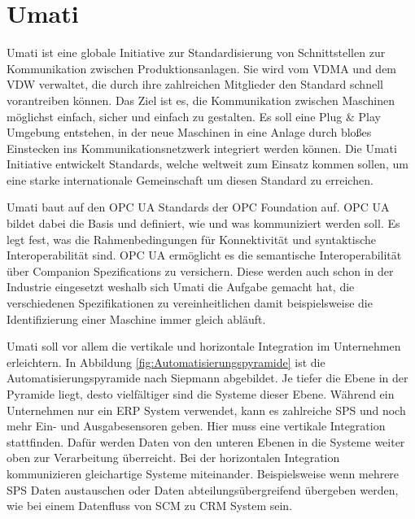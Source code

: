 \documentclass[a4paper, 12pt, oneside, toc=listofnumbered, bibliography=totoc]{scrbook}
\begin{document}
		
	
	\section{Umati}
		
		\ac{Umati} ist eine globale Initiative zur Standardisierung von Schnittstellen zur Kommunikation zwischen Produktionsanlagen. Sie wird vom \ac{VDMA} und dem \ac{VDW} verwaltet, die durch ihre zahlreichen Mitglieder den Standard schnell vorantreiben können. Das Ziel ist es, die Kommunikation zwischen Maschinen möglichst einfach, sicher und einfach zu gestalten. Es soll eine Plug \& Play Umgebung entstehen, in der neue Maschinen in eine Anlage durch bloßes Einstecken ins Kommunikationsnetzwerk integriert werden können. Die \ac{Umati} Initiative entwickelt Standards, welche weltweit zum Einsatz kommen sollen, um eine starke internationale Gemeinschaft um diesen Standard zu erreichen. \cite{noauthor_umati_2023}
		
		\ac{Umati} baut auf den OPC UA Standards der OPC Foundation auf. OPC UA bildet dabei die Basis und definiert, wie und was kommuniziert werden soll. Es legt fest, was die Rahmenbedingungen für Konnektivität und syntaktische Interoperabilität sind. \cite{noauthor_umati_2023} OPC UA ermöglicht es die semantische Interoperabilität über Companion Spezifications zu versichern. Diese werden auch schon in der Industrie eingesetzt weshalb sich \ac{Umati} die Aufgabe gemacht hat, die verschiedenen Spezifikationen zu vereinheitlichen damit beispielsweise die Identifizierung einer Maschine immer gleich abläuft.
		
		\ac{Umati} soll vor allem die vertikale und horizontale Integration im Unternehmen erleichtern. In Abbildung \ref{fig:Automatisierungspyramide} ist die Automatisierungspyramide nach Siepmann abgebildet. Je tiefer die Ebene in der Pyramide liegt, desto vielfältiger sind die Systeme dieser Ebene. Während ein Unternehmen nur ein \ac{ERP} System verwendet, kann es zahlreiche SPS und noch mehr Ein- und Ausgabesensoren geben. Hier muss eine vertikale Integration stattfinden. Dafür werden Daten von den unteren Ebenen in die Systeme weiter oben zur Verarbeitung überreicht. Bei der horizontalen Integration kommunizieren gleichartige Systeme miteinander. Beispielsweise wenn mehrere SPS Daten austauschen oder Daten abteilungsübergreifend übergeben werden, wie bei einem Datenfluss von SCM zu CRM System sein. 
		
\end{document}
